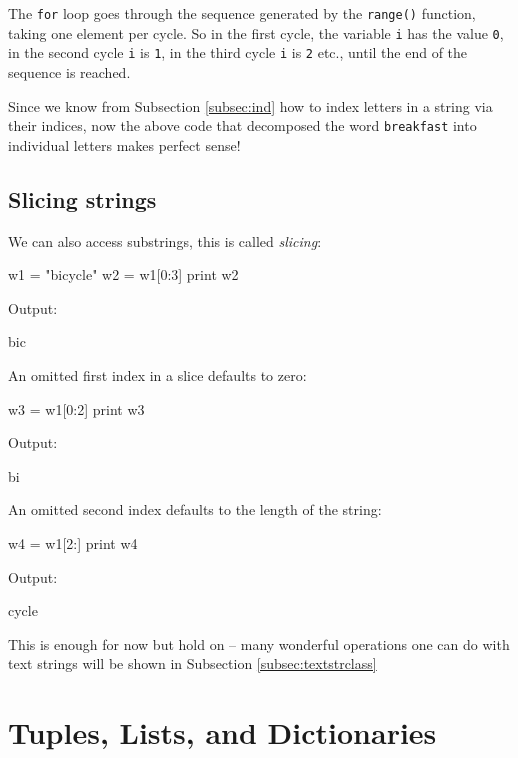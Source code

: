 \begin{bluecode}
[4, 5, 6, 7, 8, 9]
\end{bluecode}
The {\tt for} loop goes through the sequence generated by the {\tt range()} function, 
taking one element per cycle. So in the first cycle, the variable {\tt i}
has the value {\tt 0}, in the second cycle {\tt i} is {\tt 1}, in the third cycle 
{\tt i} is {\tt 2} etc., until the end of the sequence is reached. 

Since we know from Subsection \ref{subsec:ind} 
how to index letters in a string via their indices, now the above 
code that decomposed the word {\tt breakfast} into individual letters
makes perfect sense!

\subsection{Slicing strings}

We can also access substrings, this is called {\em slicing}:

\begin{bluecode}
w1 = "bicycle"
w2 = w1[0:3]
print w2
\end{bluecode}
Output:

\begin{bluecode}
bic
\end{bluecode}
An omitted first index in a slice defaults to zero:

\begin{bluecode}
w3 = w1[0:2]
print w3
\end{bluecode}
Output:

\begin{bluecode}
bi
\end{bluecode}
An omitted second index defaults to the length of the string:

\begin{bluecode}
w4 = w1[2:]
print w4
\end{bluecode}
Output:

\begin{bluecode}
cycle
\end{bluecode}
This is enough for now but hold on -- many wonderful operations one 
can do with text strings will be shown in Subsection \ref{subsec:textstrclass}



\section{Tuples, Lists, and Dictionaries}\label{sec:lists}

